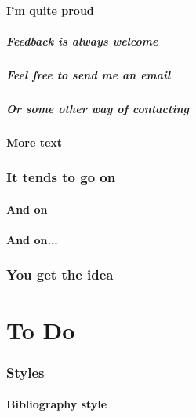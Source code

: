 \documentclass[12pt,a4paper]{csum}
\begin{document}
        \subsection{I'm quite proud}
        \lipsum[24-25]
            \subsubsection{Feedback is always welcome}
            \lipsum[26]
            \subsubsection{Feel free to send me an email}
            \lipsum[27]
            \subsubsection{Or some other way of contacting}
            \lipsum[28-29]
        \subsection{More text}
        \lipsum[30-31]
    \section{It tends to go on}
        \lipsum[32]
        \subsection{And on}
        \lipsum[33]
        \subsection{And on...}
        \lipsum[34]
    \section{You get the idea}
    \lipsum[35-37]
\part{To Do}

    \section{Styles}

        \subsection{Bibliography style}
        \lipsum[39]
\end{document}
